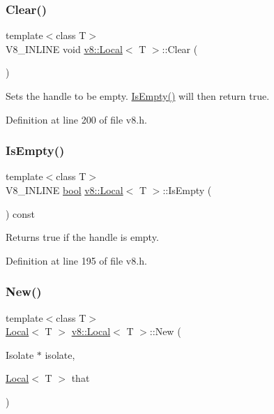 \subsubsection{\texorpdfstring{Clear()}{Clear()}}
{\footnotesize\ttfamily template$<$class T$>$ \\
V8\+\_\+\+I\+N\+L\+I\+NE void \mbox{\hyperlink{classv8_1_1Local}{v8\+::\+Local}}$<$ T $>$\+::Clear (\begin{DoxyParamCaption}{ }\end{DoxyParamCaption})\hspace{0.3cm}{\ttfamily [inline]}}

Sets the handle to be empty. \mbox{\hyperlink{classv8_1_1Local_aeec81dfca98e0d5b2f26ae13c2d141f4}{Is\+Empty()}} will then return true. 

Definition at line 200 of file v8.\+h.

\mbox{\label{classv8_1_1Local_aeec81dfca98e0d5b2f26ae13c2d141f4}} 
\subsubsection{\texorpdfstring{Is\+Empty()}{IsEmpty()}}
{\footnotesize\ttfamily template$<$class T$>$ \\
V8\+\_\+\+I\+N\+L\+I\+NE \mbox{\hyperlink{classbool}{bool}} \mbox{\hyperlink{classv8_1_1Local}{v8\+::\+Local}}$<$ T $>$\+::Is\+Empty (\begin{DoxyParamCaption}{ }\end{DoxyParamCaption}) const\hspace{0.3cm}{\ttfamily [inline]}}

Returns true if the handle is empty. 

Definition at line 195 of file v8.\+h.

\mbox{\label{classv8_1_1Local_a1b3c386fb10d9e8f67aecec9174de1fa}} 
\subsubsection{\texorpdfstring{New()}{New()}}
{\footnotesize\ttfamily template$<$class T$>$ \\
\mbox{\hyperlink{classv8_1_1Local}{Local}}$<$ T $>$ \mbox{\hyperlink{classv8_1_1Local}{v8\+::\+Local}}$<$ T $>$\+::New (\begin{DoxyParamCaption}\item[{Isolate $\ast$}]{isolate,  }\item[{\mbox{\hyperlink{classv8_1_1Local}{Local}}$<$ T $>$}]{that }\end{DoxyParamCaption})\hspace{0.3cm}{\ttfamily [static]}}

